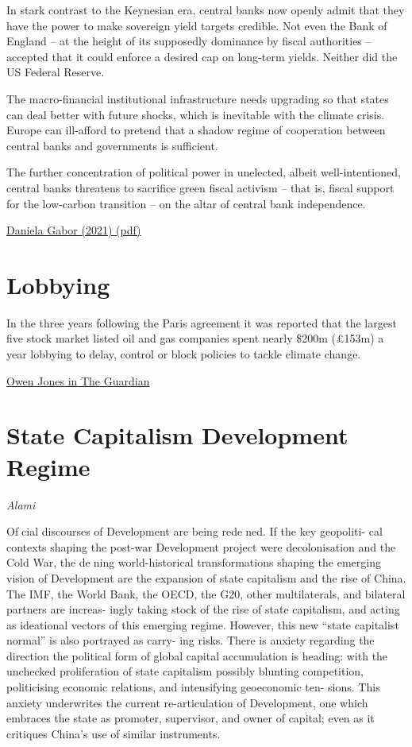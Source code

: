\documentclass[
]{book}
\begin{document}
In stark
contrast to the Keynesian era, central banks now openly admit that they have the power to
make sovereign yield targets credible. Not even the Bank of England -- at the height of its
supposedly dominance by fiscal authorities -- accepted that it could enforce a desired cap on
long-term yields. Neither did the US Federal Reserve.

The macro-financial institutional infrastructure needs upgrading
so that states can deal better with future
shocks, which is inevitable with the climate crisis.
Europe can ill-afford to pretend that a shadow regime of cooperation
between central banks and governments is sufficient.

The further concentration of political power in unelected, albeit well-intentioned,
central banks threatens to sacrifice green fiscal activism -- that is,
fiscal support for the low-carbon transition -- on the altar of central bank independence.

\href{pdf/Gabor_2021_Revolution.pdf}{Daniela Gabor (2021) (pdf)}

\hypertarget{lobbying}{%
\section{Lobbying}\label{lobbying}}

In the three years following the Paris agreement it was reported that the largest five stock market listed oil and gas companies spent nearly \$200m (£153m) a year lobbying to delay, control or block policies to tackle climate change.

\href{https://www.theguardian.com/commentisfree/2021/mar/19/planet-pursuit-profit-oil-companies-damage}{Owen Jones in The Guardian}

\hypertarget{state-capitalism-development-regime}{%
\section{State Capitalism Development Regime}\label{state-capitalism-development-regime}}

\emph{Alami}

Ofcial discourses of Development are being redened. If the key geopoliti-
cal contexts shaping the post-war Development project were decolonisation and the
Cold War, the dening world-historical transformations shaping the emerging vision of
Development are the expansion of state capitalism and the rise of China. The IMF, the
World Bank, the OECD, the G20, other multilaterals, and bilateral partners are increas-
ingly taking stock of the rise of state capitalism, and acting as ideational vectors of this
emerging regime. However, this new ``state capitalist normal'' is also portrayed as carry-
ing risks. There is anxiety regarding the direction the political form of global capital
accumulation is heading: with the unchecked proliferation of state capitalism possibly
blunting competition, politicising economic relations, and intensifying geoeconomic ten-
sions. This anxiety underwrites the current re-articulation of Development, one which
embraces the state as promoter, supervisor, and owner of capital; even as it critiques
China's use of similar instruments.
\end{document}
